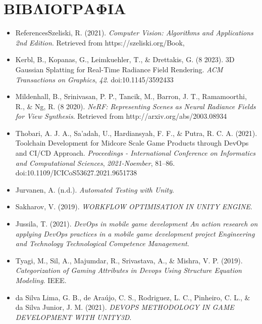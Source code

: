 \chapter{ΒΙΒΛΙΟΓΡΑΦΙΑ}
\begin{itemize}
    \item ReferencesSzeliski, R. (2021). \textit{Computer Vision: Algorithms and Applications 2nd Edition}. Retrieved from https://szeliski.org/Book,

    \item Kerbl, B., Kopanas, G., Leimkuehler, T., \& Drettakis, G. (8 2023). 3D Gaussian Splatting for Real-Time Radiance Field Rendering. \textit{ACM Transactions on Graphics}, \textit{42}. doi:10.1145/3592433

    \item Mildenhall, B., Srinivasan, P. P., Tancik, M., Barron, J. T., Ramamoorthi, R., \& Ng, R. (8 2020). \textit{NeRF: Representing Scenes as Neural Radiance Fields for View Synthesis}. Retrieved from http://arxiv.org/abs/2003.08934

    \item Thobari, A. J. A., Sa’adah, U., Hardiansyah, F. F., \& Putra, R. C. A. (2021). Toolchain Development for Midcore Scale Game Products through DevOps and CI/CD Approach. \textit{Proceedings - International Conference on Informatics and Computational Sciences}, \textit{2021-Noember}, 81–86. doi:10.1109/ICICoS53627.2021.9651738

    \item Jurvanen, A. (n.d.). \textit{Automated Testing with Unity}.

    \item Sakharov, V. (2019). \textit{WORKFLOW OPTIMISATION IN UNITY ENGINE}.

    \item Jussila, T. (2021). \textit{DevOps in mobile game development An action research on applying DevOps practices in a mobile game development project Engineering and Technology Technological Competence Management}.

    \item Tyagi, M., Sil, A., Majumdar, R., Srivastava, A., \& Mishra, V. P. (2019). \textit{Categorization of Gaming Attributes in Devops Using Structure Equation Modeling}. IEEE.

    \item da Silva Lima, G. B., de Araújo, C. S., Rodriguez, L. C., Pinheiro, C. L., \& da Silva Junior, J. M. (2021). \textit{DEVOPS METHODOLOGY IN GAME DEVELOPMENT WITH UNITY3D}.


\end{itemize}

